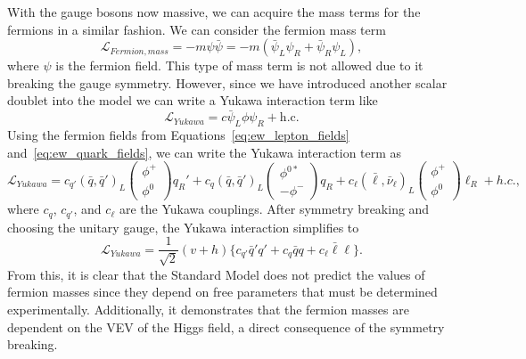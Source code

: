 With the gauge bosons now massive, we can acquire the mass terms for the fermions in a similar fashion. We can consider the fermion mass term
\begin{equation}
  \mathcal{L}_{Fermion,mass} = -m\psi\bar{\psi} = -m(\bar{\psi}_{L}\psi_{R} + \bar{\psi}_{R}\psi_{L}),
\end{equation}
where $\psi$ is the fermion field. This type of mass term is not allowed due to it breaking the gauge symmetry. However, since we have introduced another scalar doublet into the model we can write a Yukawa interaction term like
\begin{equation}
  \mathcal{L}_{Yukawa} = c\bar{\psi}_{L}\phi\psi_{R} + \mathrm{h.c.}
  \label{eq:higgs_yukawa}
\end{equation}
Using the fermion fields from Equations~\ref{eq:ew_lepton_fields} and~\ref{eq:ew_quark_fields}, we can write the Yukawa interaction term as 
\begin{equation}
  \mathcal{L}_{Yukawa} = c_{q'} {(\bar{q}, \bar{q}')}_{L}\begin{pmatrix}
    \phi^{+} \\
    \phi^{0}
  \end{pmatrix}
  q_{R}' + c_{q}{(\bar{q}, \bar{q}')}_{L}\begin{pmatrix}
    \phi^{0*} \\
    -\phi^{-}
  \end{pmatrix}
  q_{R} + c_{\ell}{(\bar{\ell}, \bar{\nu}_{\ell})_{L}}\begin{pmatrix}
    \phi^{+} \\
    \phi^{0}
  \end{pmatrix}
  \ell_{R} + h.c.,
\end{equation}
where $c_{q}$, $c_{q'}$, and $c_{\ell}$ are the Yukawa couplings. After symmetry breaking and choosing the unitary gauge, the Yukawa interaction simplifies to
\begin{equation}
  \mathcal{L}_{Yukawa} = \frac{1}{\sqrt{2}}(v+h)\{c_{q'}\bar{q}'q' + c_{q}\bar{q}q + c_{\ell}\bar{\ell}\ell\}.
\end{equation}
From this, it is clear that the Standard Model does not predict the values of fermion masses since they depend on free parameters that must be determined experimentally. Additionally, it demonstrates that the fermion masses are dependent on the VEV of the Higgs field, a direct consequence of the symmetry breaking. 

